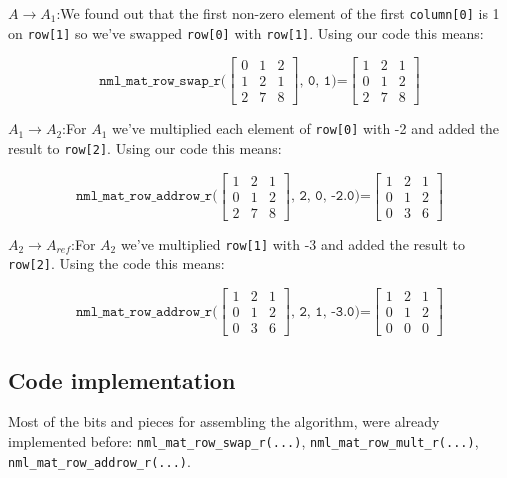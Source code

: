 $A \rightarrow A_1$:\quad We found out that the first non-zero element of the first {\tt column[0]} is 1 on {\tt row[1]} so we’ve swapped {\tt row[0]} with {\tt row[1]}. Using our code this means:

$$
\texttt{nml\_mat\_row\_swap\_r(}
\begin{bmatrix}
0 & 1 & 2 \\
1 & 2 & 1 \\
2 & 7 & 8
\end{bmatrix}
\texttt{, 0, 1)=}
\begin{bmatrix}
1 & 2 & 1 \\
0 & 1 & 2 \\
2 & 7 & 8
\end{bmatrix}
$$

$A_1 \rightarrow A_2$:\quad For $A_1$ we’ve multiplied each element of {\tt row[0]} with -2 and added the result to {\tt row[2]}. Using our code this means:

$$
\texttt{nml\_mat\_row\_addrow\_r(}
\begin{bmatrix}
1 & 2 & 1 \\
0 & 1 & 2 \\
2 & 7 & 8
\end{bmatrix}
\texttt{, 2, 0, -2.0)=}
\begin{bmatrix}
1 & 2 & 1 \\
0 & 1 & 2 \\
0 & 3 & 6
\end{bmatrix}
$$

$A_2 \rightarrow A_{ref}$:\quad For $A_2$ we’ve multiplied {\tt row[1]} with -3 and added the result to {\tt row[2]}. Using the code this means:

$$
\texttt{nml\_mat\_row\_addrow\_r(}
\begin{bmatrix}
1 & 2 & 1 \\
0 & 1 & 2 \\
0 & 3 & 6
\end{bmatrix}
\texttt{, 2, 1, -3.0)=}
\begin{bmatrix}
1 & 2 & 1 \\
0 & 1 & 2 \\
0 & 0 & 0
\end{bmatrix}
$$

\subsection{Code implementation}

Most of the bits and pieces for assembling the algorithm, were already implemented before: {\tt nml\_mat\_row\_swap\_r(...)}, {\tt nml\_mat\_row\_mult\_r(...)}, {\tt nml\_mat\_row\_addrow\_r(...)}.
\\

